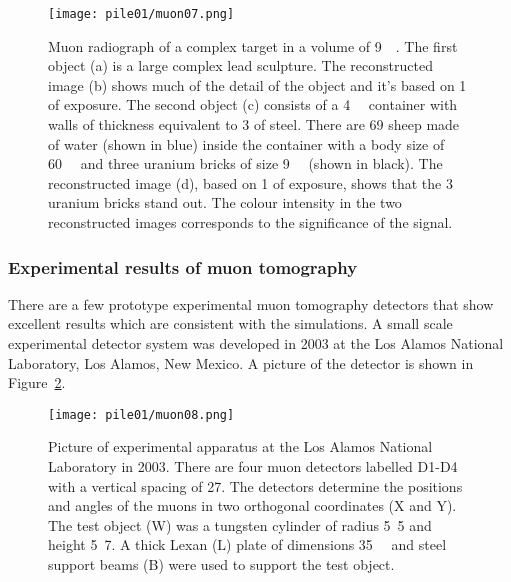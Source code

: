\documentclass[twoside,titlepage,11pt,twocolumn,a4paper]{article}
\begin{document}
\begin{figure}
  \texttt{[image: pile01/muon07.png]}
  \caption{Muon radiograph of a complex target in a volume of
    \unit{9}{\cubic\metre}. The first object (a) is a
    large complex lead sculpture. The reconstructed image (b) shows
    much of the detail of the object and it’s based on
    \unit{1}{\minute} of exposure. The second object (c) consists of a
    \unit{4}{\cubic\metre} container with walls of
    thickness equivalent to \unit{3}{\milli\metre} of steel. There are
    69 sheep made of water (shown in blue) inside the container with a
    body size of \unit{60}{\cubic{\centi\metre}} and
    three uranium bricks of size
    \unit{9}{\cubic{\centi\metre}} (shown in
    black). The reconstructed image (d), based on \unit{1}{\minute} of
    exposure, shows that the 3 uranium bricks stand out. The colour
    intensity in the two reconstructed images corresponds to the
    significance of the signal. \citep{Priedhorsky2003}}
  \label{fig:muon07}
\end{figure}

\subsubsection{Experimental results of muon tomography}
There are a few prototype experimental muon tomography detectors that
show excellent results which are consistent with the simulations.  A
small scale experimental detector system was developed in 2003 at the
Los Alamos National Laboratory, Los Alamos, New Mexico.
\citep{Priedhorsky2003} A picture of the detector is shown in
Figure~\ref{fig:muon08}.

\begin{figure}
  \texttt{[image: pile01/muon08.png]}
  \caption{Picture of experimental apparatus at the Los Alamos
    National Laboratory in 2003. There are four muon detectors
    labelled D1-D4 with a vertical spacing of
    \unit{27}{\centi\metre}. The detectors determine the positions and
    angles of the muons in two orthogonal coordinates (X and Y). The
    test object (W) was a tungsten cylinder of radius
    \unit{5.5}{\centi\metre} and height \unit{5.7}{\centi\metre}. A
    thick Lexan (L) plate of dimensions
    \unit{35}{\cubic{\centi\metre}} and steel support
    beams (B) were used to support the test object. \citep{Priedhorsky2003}}
  \label{fig:muon08}
\end{figure}
\end{document}
